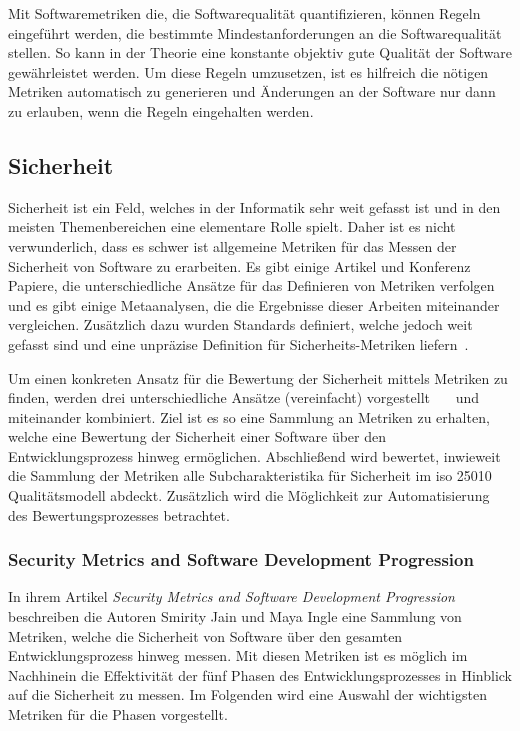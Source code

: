 \documentclass[12pt, a4paper, ngerman]{article}
\begin{document}
Mit Softwaremetriken die,
die Softwarequalität quantifizieren,
können Regeln eingeführt werden,
die bestimmte Mindestanforderungen an die Softwarequalität stellen.
So kann in der Theorie eine konstante objektiv gute Qualität der Software
gewährleistet werden.
Um diese Regeln umzusetzen, ist es hilfreich
die nötigen Metriken automatisch zu generieren
und Änderungen an der Software nur dann zu erlauben,
wenn die Regeln eingehalten werden.

\subsection{Sicherheit}

Sicherheit ist ein Feld, welches in der Informatik sehr weit gefasst ist und in den meisten Themenbereichen eine elementare Rolle spielt.
Daher ist es nicht verwunderlich, dass es schwer ist allgemeine Metriken für das Messen der Sicherheit von Software zu erarbeiten.
Es gibt einige Artikel und Konferenz Papiere, die unterschiedliche Ansätze für das Definieren von Metriken verfolgen und es gibt einige 
Metaanalysen, die die Ergebnisse dieser Arbeiten miteinander vergleichen. 
Zusätzlich dazu wurden Standards definiert, 
welche jedoch weit gefasst sind und eine unpräzise Definition für Sicherheits-Metriken liefern~\cite{MeFlado_Fernández-Medina_Piattini_2010}.

Um einen konkreten Ansatz für die Bewertung der Sicherheit mittels Metriken zu finden, werden 
drei unterschiedliche Ansätze (vereinfacht) vorgestellt~\cite{Jain2014SecurityMA}~\cite{Chowdhury_Chan_Zulkernine_2008}~\cite{Wang_Wang_Guo_Xia_2009} und 
miteinander kombiniert.
Ziel ist es so eine Sammlung an Metriken zu erhalten, 
welche eine Bewertung der Sicherheit einer Software über den Entwicklungsprozess hinweg ermöglichen. 
Abschließend wird bewertet, inwieweit die Sammlung der Metriken alle Subcharakteristika für Sicherheit im \ac{iso} 25010 Qualitätsmodell abdeckt.
Zusätzlich wird die Möglichkeit zur Automatisierung des Bewertungsprozesses betrachtet.

\subsubsection{Security Metrics and Software Development Progression~\cite{Jain2014SecurityMA}}

In ihrem Artikel \emph{Security Metrics and Software Development Progression} beschreiben die Autoren Smirity Jain und Maya Ingle eine Sammlung von Metriken, 
welche die Sicherheit von Software über den gesamten Entwicklungsprozess hinweg messen.
Mit diesen Metriken ist es möglich im Nachhinein die Effektivität der fünf Phasen des Entwicklungsprozesses in Hinblick auf die Sicherheit zu messen.
Im Folgenden wird eine Auswahl der wichtigsten Metriken für die Phasen vorgestellt.
\end{document}
